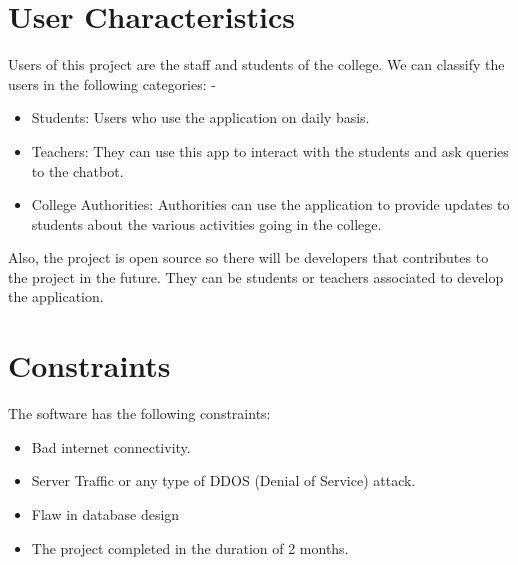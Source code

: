 \section{User Characteristics}
Users of this project are the staff and students of the college. We can classify the users in the following
categories: -
\begin{itemize}
\item Students: Users who use the application on daily basis.
\item Teachers: They can use this app to interact with the students and ask queries to the chatbot.
\item College Authorities: Authorities can use the application to provide updates to students about the
various activities going in the college.
\end{itemize}
Also, the project is open source so there will be developers that contributes to the project in the future. They
can be students or teachers associated to develop the application.
\section{Constraints}
The software has the following constraints:
\begin{itemize}
\item Bad internet connectivity.
\item Server Traffic or any type of DDOS (Denial of Service) attack.
\item Flaw in database design
\item The project completed in the duration of 2 months.
\end{itemize}

